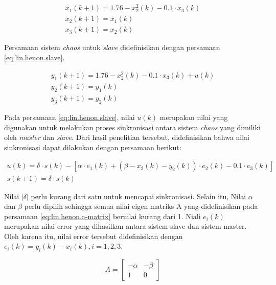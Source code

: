 \begin{equation}
  \label{eq:lin.henon.master}
  \begin{array}{l}   
    x_1(k+1) = 1.76 - x_2^2(k) - 0.1 \cdot x_3(k)\\
    x_2(k+1) = x_1(k)\\
    x_3(k+1) = x_2(k)
  \end{array}
\end{equation}

Persamaan sistem \emph{chaos} untuk \emph{slave} didefinisikan dengan persamaan \ref{eq:lin.henon.slave}.

\begin{equation}
  \label{eq:lin.henon.slave}
  \begin{array}{l}   
    y_1(k+1) = 1.76 - x_2^2(k) - 0.1 \cdot x_3(k) + u(k)\\
    y_2(k+1) = y_1(k)\\
    y_3(k+1) = y_2(k)
  \end{array}
\end{equation}

Pada persamaan \ref{eq:lin.henon.slave}, nilai $u(k)$ merupakan nilai yang digunakan untuk melakukan proses sinkronisasi antara sistem \emph{chaos} yang dimiliki oleh \emph{master} dan \emph{slave}. Dari hasil penelitian tersebut, didefinisikan bahwa nilai sinkronisasi dapat dilakukan dengan persamaan berikut:

\begin{equation}
  \label{eq:lin.henon.sync}
  \begin{array}{l}   
    u(k) = \delta \cdot s(k) - [\alpha \cdot e_1(k) + (\beta - x_2(k) - y_2(k)) \cdot e_2(k) - 0.1 \cdot e_3(k)]\\
    s(k+1) = \delta \cdot s(k)
  \end{array}
\end{equation}

Nilai $|\delta|$ perlu kurang dari satu untuk mencapai sinkronisasi. Selain itu, Nilai $\alpha$ dan $\beta$ perlu dipilih sehingga semua nilai eigen matriks A yang didefinisikan pada persamaan \ref{eq:lin.henon.a-matrix} bernilai kurang dari 1. Niali $e_i(k)$ merupakan nilai error yang dihasilkan antara sistem slave dan sistem master. Oleh karena itu, nilai error tersebut didefinisikan dengan $e_i(k) = y_i(k) - x_i(k), i = 1,2,3$.

\begin{equation}
\label{eq:lin.henon.a-matrix}
A = \begin{bmatrix}
  -\alpha & -\beta \\
  1 & 0 
  \end{bmatrix}
\end{equation}

